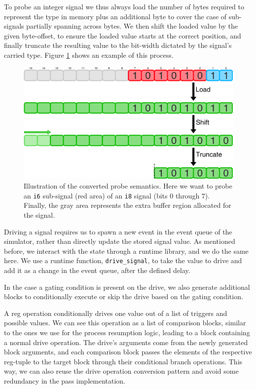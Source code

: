 To probe an integer signal we thus always load the number of bytes required to represent the type in memory plus an additional byte to cover the case of sub-signals partially spanning across bytes. We then shift the loaded value by the given byte-offset, to ensure the loaded value starts at the correct position, and finally truncate the resulting value to the bit-width dictated by the signal's carried type. Figure \ref{fig:prb} shows an example of this process.

\begin{figure}[ht]
    \includegraphics[width=\textwidth]{gfx/Probe.png}
    \caption[Illustration of the converted probe semantics.]{Illustration of the converted probe semantics. Here we want to probe an \texttt{i6} sub-signal (red area) of an \texttt{i8} signal (bits $0$
        through $7$). Finally, the gray area represents the extra buffer region allocated for the signal.}
    \label{fig:prb}
\end{figure}

Driving a signal requires us to spawn a new event in the event queue of the simulator, rather than directly update the stored signal value. As mentioned before, we interact with the state through a runtime library, and we do the same here. We use a runtime function, \texttt{drive\_signal}, to take the value to drive and add it as a change in the event queue, after the defined delay.

In the case a gating condition is present on the drive, we also generate additional blocks to conditionally execute or skip the drive based on the gating condition.

A reg operation conditionally drives one value out of a list of triggers and possible values. We can see this operation as a list of comparison blocks, similar to the ones we use for the process resumption logic, leading to a block containing a normal drive operation. The drive's arguments come from the newly generated block arguments, and each comparison block passes the elements of the respective reg-tuple to the target block through their conditional branch operations. This way, we can also reuse the drive operation conversion pattern and avoid some redundancy in the pass implementation.

